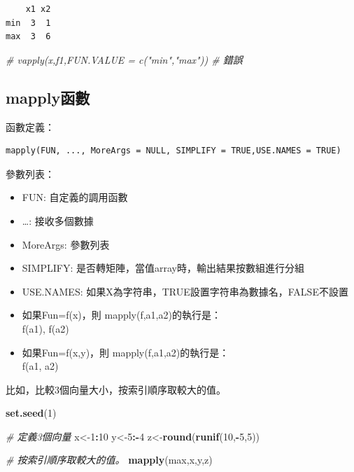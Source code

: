 \documentclass[]{book}
\newenvironment{Shaded}{\begin{snugshade}}{\end{snugshade}}
\newcommand{\CommentTok}[1]{\textcolor[rgb]{0.56,0.35,0.01}{\textit{#1}}}
\newcommand{\DecValTok}[1]{\textcolor[rgb]{0.00,0.00,0.81}{#1}}
\newcommand{\KeywordTok}[1]{\textcolor[rgb]{0.13,0.29,0.53}{\textbf{#1}}}
\newcommand{\NormalTok}[1]{#1}
\newcommand{\OperatorTok}[1]{\textcolor[rgb]{0.81,0.36,0.00}{\textbf{#1}}}
\theoremstyle{definition}
\theoremstyle{definition}
\theoremstyle{definition}
\theoremstyle{remark}
\begin{document}
\begin{verbatim}
    x1 x2
min  3  1
max  3  6
\end{verbatim}

\begin{Shaded}
\begin{Highlighting}[]
\CommentTok{# vapply(x,f1,FUN.VALUE = c("min","max")) # 錯誤}
\end{Highlighting}
\end{Shaded}

\hypertarget{mapply}{%
\subsection{mapply函數}\label{mapply}}

函數定義：

\begin{verbatim}
mapply(FUN, ..., MoreArgs = NULL, SIMPLIFY = TRUE,USE.NAMES = TRUE)
\end{verbatim}

參數列表：

\begin{itemize}
\item
  FUN: 自定義的調用函數
\item
  \ldots{}: 接收多個數據
\item
  MoreArgs: 參數列表
\item
  SIMPLIFY: 是否轉矩陣，當值array時，輸出結果按數組進行分組
\item
  USE.NAMES: 如果X為字符串，TRUE設置字符串為數據名，FALSE不設置
\item
  如果Fun=f(x)，則 mapply(f,a1,a2)的執行是：\\
  f(a1), f(a2)
\item
  如果Fun=f(x,y)，則 mapply(f,a1,a2)的執行是：\\
  f(a1, a2)
\end{itemize}

比如，比較3個向量大小，按索引順序取較大的值。

\begin{Shaded}
\begin{Highlighting}[]
\KeywordTok{set.seed}\NormalTok{(}\DecValTok{1}\NormalTok{)}

\CommentTok{# 定義3個向量}
\NormalTok{x<-}\DecValTok{1}\OperatorTok{:}\DecValTok{10}
\NormalTok{y<-}\DecValTok{5}\OperatorTok{:-}\DecValTok{4}
\NormalTok{z<-}\KeywordTok{round}\NormalTok{(}\KeywordTok{runif}\NormalTok{(}\DecValTok{10}\NormalTok{,}\OperatorTok{-}\DecValTok{5}\NormalTok{,}\DecValTok{5}\NormalTok{))}

\CommentTok{# 按索引順序取較大的值。}
\KeywordTok{mapply}\NormalTok{(max,x,y,z)}
\end{Highlighting}
\end{Shaded}
\end{document}
